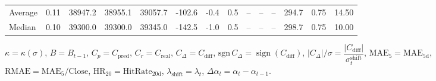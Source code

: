 \begin{threeparttable}
{\begin{tabular}{lrrrrrrrrrrrrr}
Average &     0.11 & 38947.2 & 38955.1 & 39057.7 &     -102.6 &                     -0.4 &                 0.5 &         -- &        -- &             -- &            294.7 &            0.75 &                  14.50 \\
 Median &     0.10 & 39300.0 & 39300.0 & 39345.0 &     -142.5 &                     -1.0 &                 0.5 &         -- &        -- &             -- &            298.7 &            0.75 &                  10.00 \\
\bottomrule
\end{tabular}
}
\begin{tablenotes}\footnotesize
\item $\kappa=\kappa(\sigma)$, $B=B_{t-1}$, $C_p=C_{\text{pred}}$, $C_r=C_{\text{real}}$, $C_\Delta=C_{\text{diff}}$, $\mathrm{sgn}\,C_\Delta=\operatorname{sign}(C_{\text{diff}})$, $|C_\Delta|/\sigma=\dfrac{|C_{\text{diff}}|}{\sigma_t^{\text{shift}}}$, $\mathrm{MAE}_5=\mathrm{MAE}_{5\text{d}}$, $\mathrm{RMAE}= \mathrm{MAE}_5 / \text{Close}$, $\mathrm{HR}_{20}=\mathrm{HitRate}_{20\text{d}}$, 
$\lambda_{\text{shift}}=\lambda_t$, 
$\Delta\alpha_t=\alpha_t-\alpha_{t-1}$.
\end{tablenotes}
\end{threeparttable}
\endgroup

